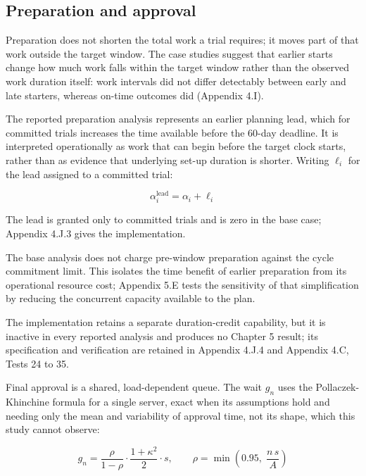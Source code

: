 \subsection{Preparation and approval}
\label{sec:preparation}

Preparation does not shorten the total work a trial requires; it moves part of that work outside the target window. The case studies suggest that earlier starts change how much work falls within the target window rather than the observed work duration itself: work intervals did not differ detectably between early and late starters, whereas on-time outcomes did (Appendix 4.I).

The reported preparation analysis represents an earlier planning lead, which for committed trials increases the time available before the 60-day deadline. It is interpreted operationally as work that can begin before the target clock starts, rather than as evidence that underlying set-up duration is shorter. Writing $\ell_i$ for the lead assigned to a committed trial:

\begin{equation}
  \alpha_i^{\text{lead}} = \alpha_i + \ell_i
  \label{eq:lead}
\end{equation}

The lead is granted only to committed trials and is zero in the base case; Appendix 4.J.3 gives the implementation.

The base analysis does not charge pre-window preparation against the cycle commitment limit. This isolates the time benefit of earlier preparation from its operational resource cost; Appendix 5.E tests the sensitivity of that simplification by reducing the concurrent capacity available to the plan.

The implementation retains a separate duration-credit capability, but it is inactive in every reported analysis and produces no Chapter 5 result; its specification and verification are retained in Appendix 4.J.4 and Appendix 4.C, Tests 24 to 35.

Final approval is a shared, load-dependent queue. The wait $g_n$ uses the Pollaczek-Khinchine formula for a single server, exact when its assumptions hold and needing only the mean and variability of approval time, not its shape, which this study cannot observe:

\begin{equation}
  g_n = \frac{\rho}{1-\rho} \cdot \frac{1+\kappa^2}{2} \cdot s, \qquad \rho = \min\left(0.95,\; \frac{n\,s}{A}\right)
  \label{eq:pk}
\end{equation}

